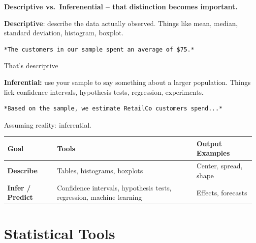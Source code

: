 \documentclass[
  letterpaper,
  DIV=11,
  numbers=noendperiod]{scrreprt}
\newcounter{none} %
\begin{document}
\textbf{Descriptive vs.~Inferenential -- that distinction becomes
important.}

\textbf{Descriptive}: describe the data actually observed. Things like
mean, median, standard deviation, histogram, boxplot.

\begin{verbatim}
*The customers in our sample spent an average of $75.*
\end{verbatim}

That's descriptive

\textbf{Inferential:} use your sample to say something about a larger
population. Things liek confidence intervals, hypothesis tests,
regression, experiments.

\begin{verbatim}
*Based on the sample, we estimate RetailCo customers spend...*
\end{verbatim}

Assuming reality: inferential.

{\def\LTcaptype{none} %
\begin{longtable}[]{@{}
  >{\raggedright\arraybackslash}p{}
  >{\raggedright\arraybackslash}p{}
  >{\raggedright\arraybackslash}p{}@{}}
\toprule\noalign{}
\begin{minipage}[b]{\linewidth}\raggedright
Goal
\end{minipage} & \begin{minipage}[b]{\linewidth}\raggedright
Tools
\end{minipage} & \begin{minipage}[b]{\linewidth}\raggedright
Output Examples
\end{minipage} \\
\midrule\noalign{}
\endhead
\bottomrule\noalign{}
\endlastfoot
\textbf{Describe} & Tables, histograms, boxplots & Center, spread,
shape \\
\textbf{Infer / Predict} & Confidence intervals, hypothesis tests,
regression, machine learning & Effects, forecasts \\
\end{longtable}
}

\section{Statistical Tools}\label{statistical-tools}
\end{document}
